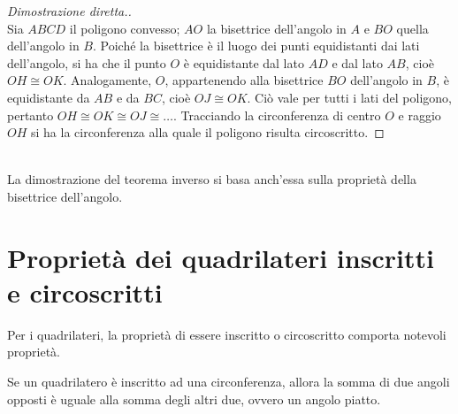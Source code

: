 \noindent\begin{minipage}{0.6\textwidth}\parindent15pt
\begin{proof}[Dimostrazione diretta.]~\\
Sia \(ABCD\) il poligono convesso; \(AO\) la bisettrice dell'angolo in 
\(A\) e \(BO\) quella dell'angolo in \(B\). Poiché la bisettrice è il luogo 
dei punti equidistanti dai lati dell'angolo, si ha che il punto \(O\) è 
equidistante dal lato \(AD\) e dal lato \(AB\), cioè \(OH\cong OK\). 
Analogamente, \(O\), appartenendo alla bisettrice \(BO\) dell'angolo in 
\(B\), è equidistante da \(AB\) e da \(BC\), cioè \(OJ\cong OK\). Ciò vale 
per tutti i lati del poligono, pertanto \(OH\cong OK\cong OJ\cong 
\ldots\). Tracciando la circonferenza di centro \(O\) e raggio \(OH\) si ha 
la circonferenza alla quale il poligono risulta circoscritto.
\end{proof}
\end{minipage}\hfil
\noindent\begin{minipage}{0.4\textwidth}
  \centering
\end{minipage}\\[1em]
La dimostrazione del teorema inverso si basa anch'essa sulla 
proprietà della bisettrice dell'angolo.

\newpage %

\section{Proprietà dei quadrilateri inscritti e circoscritti}
\label{sect:quadrilateri_circonferenza}

Per i quadrilateri, la proprietà di essere inscritto o circoscritto 
comporta notevoli proprietà.

\begin{teorema}\label{teo:6.5}
Se un quadrilatero è inscritto ad una circonferenza, allora la somma 
di due angoli opposti è uguale alla somma degli altri due, ovvero un 
angolo piatto.
\end{teorema}


\begin{inaccessibleblock}
 \begin{figure}[htb]
  \centering
\end{figure}
\end{inaccessibleblock}

